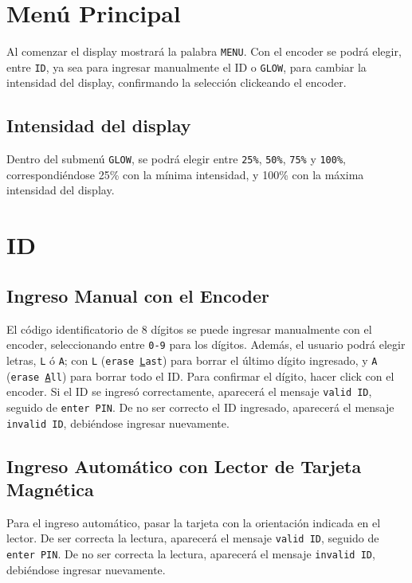 \section{Menú Principal}

Al comenzar el display mostrará la palabra \texttt{MENU}. 
Con el encoder se podrá elegir, entre \texttt{ID}, 
ya sea para ingresar manualmente el ID o \texttt{GLOW}, para cambiar la intensidad del display, 
confirmando la selección clickeando el encoder.

\subsection{Intensidad del display}

Dentro del submenú \texttt{GLOW}, se podrá elegir entre \texttt{25\%}, \texttt{50\%}, \texttt{75\%} y \texttt{100\%}, 
correspondiéndose 25\% con la mínima intensidad, y 100\% con la máxima intensidad del display.

\section{ID}
\subsection{Ingreso Manual con el Encoder}
\label{pinsection}
El código identificatorio de 8 dígitos se puede ingresar manualmente con el encoder, 
seleccionando entre \texttt{0-9} para los dígitos. Además, el usuario podrá elegir letras,
 \texttt{L} ó \texttt{A}; con \texttt{L} (\texttt{erase \underline{L}ast}) para borrar el último dígito ingresado, 
 y \texttt{A} (\texttt{erase \underline{A}ll}) para borrar todo el ID.
 Para confirmar el dígito, hacer click con el encoder.
 Si el ID se ingresó correctamente, aparecerá el mensaje \texttt{valid ID}, seguido de \texttt{enter PIN}.
 De no ser correcto el ID ingresado, aparecerá el mensaje \texttt{invalid ID}, debiéndose ingresar nuevamente.

 \subsection{Ingreso Automático con Lector de Tarjeta Magnética}
 Para el ingreso automático, pasar la tarjeta con la orientación indicada en el lector.
 De ser correcta la lectura, aparecerá el mensaje \texttt{valid ID}, seguido de \texttt{enter PIN}.
 De no ser correcta la lectura, aparecerá el mensaje \texttt{invalid ID}, debiéndose ingresar nuevamente.

